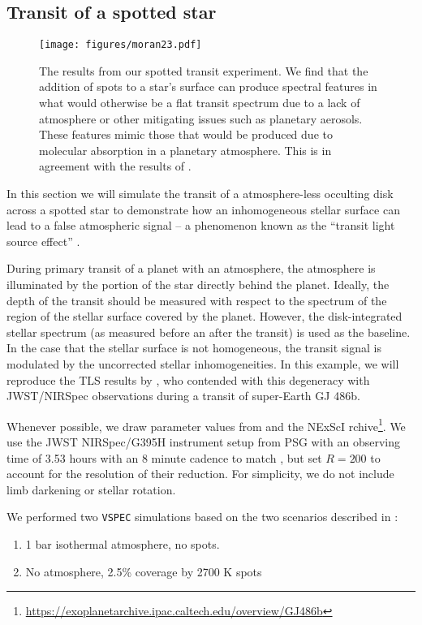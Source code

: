 \documentclass[linenumbers,5p,twocolumn,authoryear]{elsarticle}
\newcommand{\vspec}[1]{\texttt{VSPEC}#1}
\begin{document}
\subsection{Transit of a spotted star}

\begin{figure}
    \centering
    \texttt{[image: figures/moran23.pdf]}
    \caption{
        The results from our spotted transit experiment. We find that the addition of spots to a star's surface can produce spectral features in what would otherwise be a flat transit spectrum due to a lack of atmosphere or other mitigating issues such as planetary aerosols.  These features mimic those that would be produced due to molecular absorption in a planetary atmosphere. This is in agreement with the results of \citet{moran2023}.
        }
    \label{fig:moran_transit}
\end{figure}

In this section we will simulate the transit of a atmosphere-less occulting disk across a spotted star to demonstrate how an inhomogeneous
stellar surface can lead to a false atmospheric signal -- a phenomenon known as the ``transit light source effect'' \citep{rackham2018}.

During primary transit of a planet with an atmosphere, the atmosphere is illuminated by the portion of the star directly behind the planet. Ideally, the depth of the transit should be measured with respect to the spectrum of the region of the stellar surface covered by the planet. However, the disk-integrated stellar spectrum (as measured before an after the transit) is used as the baseline. In the case that the stellar surface is not homogeneous, the transit signal is modulated by the uncorrected stellar inhomogeneities. In this example, we will reproduce the TLS results by \citet{moran2023}, who contended with this degeneracy with JWST/NIRSpec observations during a transit of super-Earth GJ 486b.

Whenever possible, we draw parameter values from \citet{moran2023} and the NExScI rchive\footnote{\url{https://exoplanetarchive.ipac.caltech.edu/overview/GJ486b}}. We use the JWST NIRSpec/G395H instrument setup from PSG with an observing time of 3.53 hours with an 8 minute cadence to match \citet{moran2023}, but set $R=200$ to account for the resolution of their reduction. For simplicity, we do not include limb darkening or stellar rotation.

We performed two \vspec{} simulations based on the two scenarios described in \citet{moran2023}:
\begin{enumerate}
    \item 1 bar  isothermal atmosphere, no spots. \label{case:1barh2o}
    \item No atmosphere, 2.5\% coverage by 2700 K spots \label{case:no_atmo}
\end{enumerate}
\end{document}
